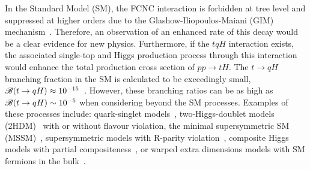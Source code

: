 In the Standard Model (SM), the FCNC interaction is forbidden at tree level and suppressed at higher orders due to the Glashow-Iliopoulos-Maiani (GIM) mechanism~\cite{Glashow:1970gm}. Therefore, an observation of an enhanced rate of this decay would be a clear evidence for new physics.
Furthermore, if the $tqH$ interaction exists, the associated single-top and  Higgs  production process through this interaction would enhance
the total production cross section of $pp\rightarrow tH$.
The $t\to qH$ branching fraction in the SM is calculated to be exceedingly small, $\mathscr{B}(t\to qH)\approx10^{-15}$~\cite{Eilam:1990zc,Mele:1998ag,AguilarSaavedra:2004wm,Zhang:2013xya}. 
However, these branching ratios can be as high as $\mathscr{B}(t\to qH) \sim 10^{-5}$ when considering beyond the SM processes. Examples of these processes include: quark-singlet models~\cite{AguilarSaavedra:2002kr}, two-Higgs-doublet models (2HDM)~\cite{ Branco:2hdm2012} with or without flavour violation,
the minimal supersymmetric SM (MSSM)~\cite{Bejar:2000ub, Guasch:1999jp,Cao:2007dk,Cao:2014udj},
supersymmetric models with R-parity violation~\cite{Eilam:2001dh}, composite Higgs models with partial  compositeness~\cite{Azatov:2014lha}, 
or warped extra dimensions models with SM fermions in the bulk~\cite{Azatov:2009na}. 
